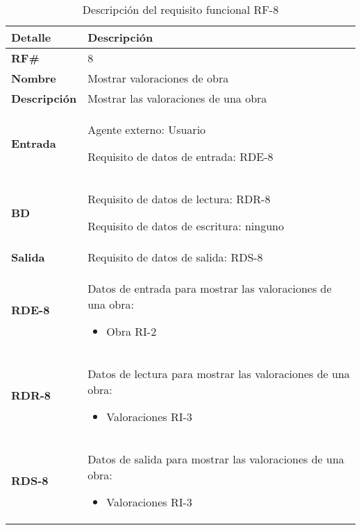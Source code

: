 \begin{table}[H]
    \centering
    \begin{tabular}{|p{3cm}|p{8cm}|}
        \hline
        \rowcolor{lightgray}
        \textbf{Detalle} & \textbf{Descripción} \\
        \hline
        \textbf{RF\#} & 8 \\
        \hline
        \textbf{Nombre} & Mostrar valoraciones de obra \\
        \hline
        \textbf{Descripción} & Mostrar las valoraciones de una obra \\
        \hline
        \textbf{Entrada} &
        Agente externo: Usuario
        
        Requisito de datos de entrada: RDE-8 \\
        \hline
        \textbf{BD} &
        Requisito de datos de lectura: RDR-8
        
        Requisito de datos de escritura: ninguno \\
        \hline
        \textbf{Salida} & Requisito de datos de salida: RDS-8 \\
        \hline
        \textbf{RDE-8} & Datos de entrada para mostrar las valoraciones de una obra:
            \begin{itemize}
                \item Obra RI-2
            \end{itemize} \\
        \hline
        \textbf{RDR-8} & Datos de lectura para mostrar las valoraciones de una obra:
            \begin{itemize}
                \item Valoraciones RI-3
            \end{itemize} \\
        \hline
        \textbf{RDS-8} & Datos de salida para mostrar las valoraciones de una obra:
            \begin{itemize}
                \item Valoraciones RI-3
            \end{itemize} \\
        \hline
    \end{tabular}
    \caption{Descripción del requisito funcional RF-8}
    \label{tab:rf-8}
\end{table}

